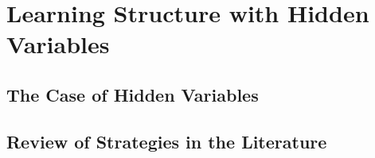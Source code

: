 \section{Learning Structure with Hidden Variables}
\subsection{The Case of Hidden Variables}
\subsection{Review of Strategies in the Literature}